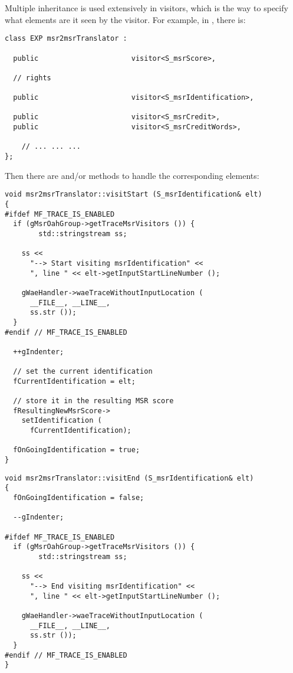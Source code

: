 Multiple inheritance is used extensively in visitors, which is the way to specify what elements are {it seen} by the visitor. For example, in , there is:
\begin{lstlisting}[language=CPlusPlus]
class EXP msr2msrTranslator :

  public                      visitor<S_msrScore>,

  // rights

  public                      visitor<S_msrIdentification>,

  public                      visitor<S_msrCredit>,
  public                      visitor<S_msrCreditWords>,

    // ... ... ...
};
\end{lstlisting}

Then there are  and/or  methods to handle the corresponding elements:
\begin{lstlisting}[language=CPlusPlus]
void msr2msrTranslator::visitStart (S_msrIdentification& elt)
{
#ifdef MF_TRACE_IS_ENABLED
  if (gMsrOahGroup->getTraceMsrVisitors ()) {
		std::stringstream ss;

    ss <<
      "--> Start visiting msrIdentification" <<
      ", line " << elt->getInputStartLineNumber ();

    gWaeHandler->waeTraceWithoutInputLocation (
      __FILE__, __LINE__,
      ss.str ());
  }
#endif // MF_TRACE_IS_ENABLED

  ++gIndenter;

  // set the current identification
  fCurrentIdentification = elt;

  // store it in the resulting MSR score
  fResultingNewMsrScore->
    setIdentification (
      fCurrentIdentification);

  fOnGoingIdentification = true;
}
\end{lstlisting}

\begin{lstlisting}[language=CPlusPlus]
void msr2msrTranslator::visitEnd (S_msrIdentification& elt)
{
  fOnGoingIdentification = false;

  --gIndenter;

#ifdef MF_TRACE_IS_ENABLED
  if (gMsrOahGroup->getTraceMsrVisitors ()) {
		std::stringstream ss;

    ss <<
      "--> End visiting msrIdentification" <<
      ", line " << elt->getInputStartLineNumber ();

    gWaeHandler->waeTraceWithoutInputLocation (
      __FILE__, __LINE__,
      ss.str ());
  }
#endif // MF_TRACE_IS_ENABLED
}
\end{lstlisting}

